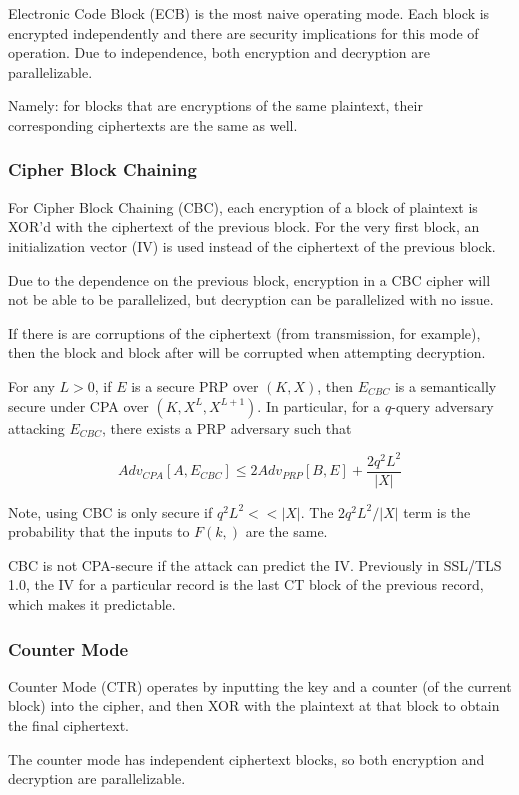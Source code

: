 \documentclass{article}
\begin{document}
\begin{multicols}{2}
Electronic Code Block (ECB) is the most naive operating mode. Each block is encrypted independently and there are security implications for this mode of operation. Due to independence, both encryption and decryption are parallelizable.

Namely: for blocks that are encryptions of the same plaintext, their corresponding ciphertexts are the same as well.

\subsubsection{Cipher Block Chaining}

For Cipher Block Chaining (CBC), each encryption of a block of plaintext is XOR'd with the ciphertext of the previous block. For the very first block, an initialization vector (IV) is used instead of the ciphertext of the previous block.

Due to the dependence on the previous block, encryption in a CBC cipher will not be able to be parallelized, but decryption can be parallelized with no issue.

If there is are corruptions of the ciphertext (from transmission, for example), then the block and block after will be corrupted when attempting decryption.

For any $L>0$, if $E$ is a secure PRP over $(K,X)$, then $E_{CBC}$ is a semantically secure under CPA over $(K, X^L, X^{L+1})$. In particular, for a $q$-query adversary attacking $E_{CBC}$, there exists a PRP adversary such that

$$
Adv_{CPA}[A,E_{CBC}] \leq 2Adv_{PRP}[B,E] + \frac{2q^2L^2}{|X|}
$$

Note, using CBC is only secure if $q^2L^2 << |X|$. The $2q^2L^2/|X|$ term is the probability that the inputs to $F(k,)$ are the same.

CBC is not CPA-secure if the attack can predict the IV. Previously in SSL/TLS 1.0, the IV for a particular record is the last CT block of the previous record, which makes it predictable.

\subsubsection{Counter Mode}

Counter Mode (CTR) operates by inputting the key and a counter (of the current block) into the cipher, and then XOR with the plaintext at that block to obtain the final ciphertext.

The counter mode has independent ciphertext blocks, so both encryption and decryption are parallelizable.


\end{multicols}
\end{document}
